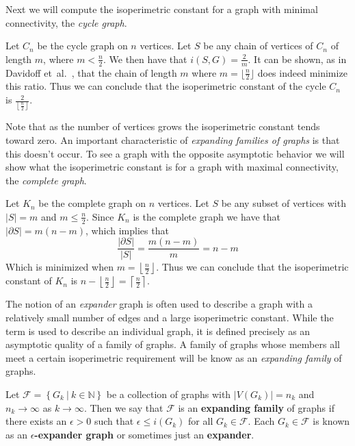 \noindent
Next we will compute the isoperimetric constant for a graph with minimal connectivity, the {\em cycle graph}. 

\begin{example}
\label{ex:cycle_graph}
Let $C_n$ be the cycle graph on $n$ vertices. Let $S$ be any chain of vertices of $C_n$ of length $m$, where $m < \frac{n}{2}$. We then have that $ i\left(S,G\right) = \frac{2}{m}$. It can be shown, as in Davidoff {et~al.}~\cite{Davidoff:2003qf}, that the chain of length $m$ where $m = \lfloor \frac{n}{2} \rfloor$ does indeed minimize this ratio. Thus we can conclude that the isoperimetric constant of the cycle $C_n$ is $\frac{2}{ \left\lfloor \frac{n}{2} \right\rfloor}$. 
\end{example}


Note that as the number of vertices grows the isoperimetric constant tends toward zero. An important characteristic of {\em expanding families of graphs} is that this doesn't occur. To see a graph with the opposite asymptotic behavior we will show what the isoperimetric constant is for a graph with maximal connectivity, the {\em complete graph}.


\begin{example}
\label{ex:complete_graph}
Let $K_n$ be the complete graph on $n$ vertices.  Let $S$ be any subset of vertices with $|S| = m$ and $m \leq \frac{n}{2}$.  Since $K_n$ is the complete graph we have that $|\partial S| = m \left( n - m \right)$, which implies that \[  \frac{|\partial S|} {|S|} =  \frac{m \left( n - m \right)}{m}   = n - m  \]  Which is minimized when $m = \left\lfloor \frac{n}{2} \right\rfloor$. Thus we can conclude that the isoperimetric constant of $K_n$ is $ n - \left\lfloor \frac{n}{2} \right\rfloor = \left\lceil \frac{n}{2} \right\rceil$. 
\end{example}


The notion of an {\em expander} graph is often used to describe a graph with a relatively small number of edges and a large isoperimetric constant. While the term is used to describe an individual graph, it is defined precisely as an asymptotic quality of a family of graphs. A family of graphs whose members all meet a certain isoperimetric requirement will be know as an {\em expanding family} of graphs.

\begin{definition}
  \label{def:expanding_family}
Let $\mathcal{F} = \left\{ G_k \ \vert \ k \in \mathbb{N} \right\}$ be a collection of graphs with $| V(G_k)| = n_k$  and $n_k \rightarrow \infty$ as $k \rightarrow \infty$. Then we say that $\mathcal{F}$ is an {\bf expanding family } of graphs if there exists an $\epsilon > 0 $ such that $ \epsilon \leq i\left( G_k \right)$ for all $G_k \in \mathcal{F}$. Each $G_k \in \mathcal{F}$ is known as an {\bf $\epsilon$-expander graph} or sometimes just an {\bf expander}. 
\end{definition}


